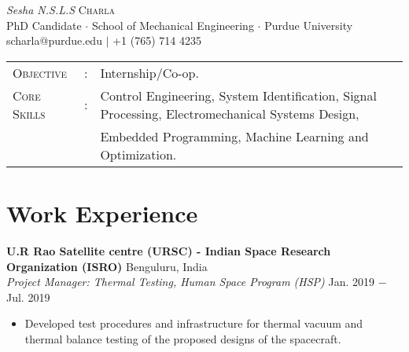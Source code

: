 \documentclass[letterpaper,10pt]{article}
\begin{document}
\begin{center}
\thispagestyle{empty}
\huge{\textit{Sesha N.S.L.S} \textsc{Charla}}\\
\small PhD Candidate $\cdot$ School of Mechanical Engineering $\cdot$ Purdue University\\
\small scharla@purdue.edu $\mid$ +1 (765) 714 4235   \\
\end{center}



\begin{tabular}{l c l}
    {\large{\textsc{Objective}}}&:& Internship$/$Co-op.\\
	{\large{\textsc{Core Skills}}}&:& Control Engineering, System Identification, Signal Processing, Electromechanical Systems Design, \\
    & & Embedded Programming, Machine Learning and Optimization.\\
\end{tabular}


\section{Work Experience}
\noindent \textbf{U.R Rao Satellite centre (URSC) - Indian Space Research Organization (ISRO)} \hfill Benguluru, India \\
\textit{Project Manager: Thermal Testing, Human Space Program (HSP)} \hfill Jan. 2019 $-$ Jul. 2019
\begin{itemize}[noitemsep,nolistsep,leftmargin=0.25in,label={--}]
    \item Developed test procedures and infrastructure for thermal vacuum and thermal balance testing of the proposed designs of the spacecraft.
\end{itemize}
\end{document}
